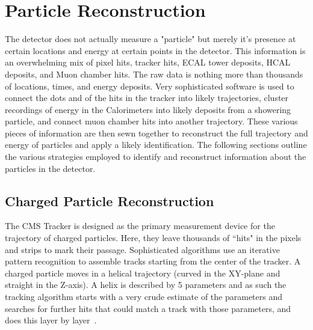 \chapter{Particle Reconstruction}
\label{ch:particle_reconstruction}
	The detector does not actually measure a "particle" but merely it's presence at certain locations and energy at certain points in the detector. This information is an overwhelming mix of pixel hits, tracker hits, ECAL tower deposits, HCAL deposits, and Muon chamber hits. The raw data is nothing more than thousands of locations, times, and energy deposits. Very sophisticated software is used to connect the dots and of the hits in the tracker into likely trajectories, cluster recordings of energy in the Calorimeters into likely deposits from a showering particle, and connect muon chamber hits into another trajectory. These various pieces of information are then sewn together to reconstruct the full trajectory and energy of particles and apply a likely identification. The following sections outline the various strategies employed to identify and reconstruct information about the particles in the detector.\\	
	
	
	\section{Charged Particle Reconstruction}
	\label{sec:charged_particle_reconstruction}
	The CMS Tracker is designed as the primary measurement device for the trajectory of charged particles. Here, they leave thousands of ``hits" in the pixels and strips to mark their passage. Sophisticated algorithms use an iterative pattern recognition to assemble tracks starting from the center of the tracker. A charged particle moves in a helical trajectory (curved in the XY-plane and straight in the Z-axis). A helix is described by 5 parameters and as such the tracking algorithm starts with a very crude estimate of the parameters and searches for further hits that could match a track with those parameters, and does this layer by layer~\cite{pixel, mangano, trackingperformance}.\\
	
